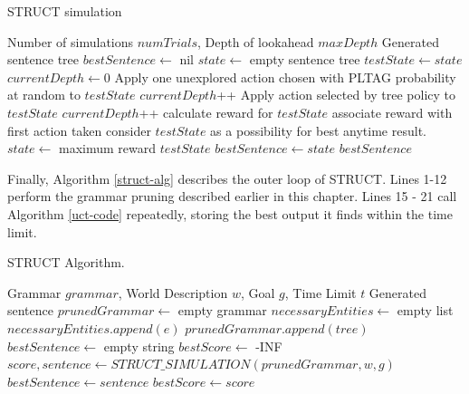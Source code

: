 \begin{algorithm}
\caption{STRUCT simulation}\label{uct-code}
\begin{algorithmic}[1]
\REQUIRE Number of simulations $numTrials$, Depth of lookahead $maxDepth$
\ENSURE Generated sentence tree
\STATE $bestSentence \gets$ nil
\STATE $state \gets$ empty sentence tree
		\STATE $testState \gets state$
		\STATE $currentDepth \gets 0$
			\STATE Apply one unexplored action chosen
                        with PLTAG probability at random to $testState$
			\STATE $currentDepth$++
		\ENDIF
			\STATE Apply action selected by tree
                        policy to $testState$
			\STATE $currentDepth$++
		\ENDWHILE
		\STATE calculate reward for $testState$
		\STATE associate reward with first action taken
			\STATE consider $testState$ as a possibility for best anytime result.
		\ENDIF
	\ENDFOR
	\STATE $state \gets$ maximum reward $testState$
		\STATE $bestSentence \gets state$
	\ENDIF
\ENDWHILE
\RETURN $bestSentence$
\end{algorithmic}
\end{algorithm}

Finally, Algorithm \ref{struct-alg} describes the outer loop of STRUCT.  Lines 1-12 perform the
grammar pruning described earlier in this chapter.  Lines 15 - 21 call Algorithm \ref{uct-code}
repeatedly, storing the best output it finds within the time limit.

\begin{algorithm}
\caption{STRUCT Algorithm.} \label{struct-alg}
\begin{algorithmic}[1]
\REQUIRE Grammar $grammar$, World Description $w$, Goal $g$, Time Limit $t$
\ENSURE Generated sentence
\STATE $prunedGrammar \gets$ empty grammar
\STATE $necessaryEntities \gets$ empty list
		\STATE $necessaryEntities.append(e)$
	\ENDIF
\ENDFOR
{}
		\STATE $prunedGrammar.append(tree)$
	\ENDIF
\ENDFOR
\STATE $bestSentence \gets$ empty string
\STATE $bestScore \gets$ -INF
	\STATE $score, sentence \gets STRUCT\_SIMULATION(prunedGrammar, w, g)$
		\STATE $bestSentence \gets sentence$
		\STATE $bestScore \gets score$
	\ENDIF
\ENDWHILE
\end{algorithmic}
\end{algorithm}